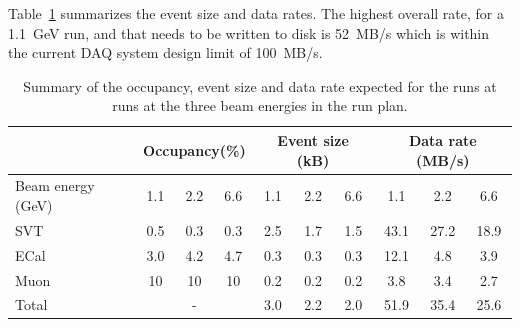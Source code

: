 Table~\ref{tab:data_rates} summarizes the event size and data rates. The highest overall rate, for a 1.1~GeV run, and that needs to be written to disk is 52~MB/s which is within the current 
DAQ system design limit of 100~MB/s. 
\begin{table}[]
\centering
\begin{tabular}{|l|ccc|ccc|ccc|}
\hline
 & \multicolumn{3}{|c|}{Occupancy(\%)} &  \multicolumn{3}{|c|}{Event size (kB)} &  \multicolumn{3}{|c|}{Data rate (MB/s)} \\
\hline
Beam energy (GeV) & 1.1 & 2.2 & 6.6 & 1.1 & 2.2 & 6.6 & 1.1 & 2.2 & 6.6 \\
\hline
SVT & 0.5 & 0.3  & 0.3  & 2.5 & 1.7 & 1.5 & 43.1 & 27.2 & 18.9\\
ECal & 3.0 & 4.2  & 4.7 & 0.3 & 0.3  & 0.3 & 12.1 & 4.8  & 3.9 \\
Muon & 10 &  10 & 10  & 0.2 & 0.2 & 0.2 & 3.8 & 3.4 & 2.7 \\
\hline
Total& \multicolumn{3}{|c|}{-} & 3.0 & 2.2 & 2.0 & 51.9 & 35.4 & 25.6 \\
\hline
\end{tabular}
\caption{{\small Summary of the occupancy, event size and data rate expected for the runs at  runs at the three beam 
energies in the run plan. }}
\label{tab:data_rates}
\end{table}
